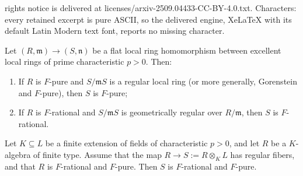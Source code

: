 \documentclass[10pt,a4paper]{amsart}
\newcommand{\fm}{\mathfrak{m}}
\newcommand{\fn}{\mathfrak{n}}
\begin{document}
rights notice is delivered at licenses/arxiv-2509.04433-CC-BY-4.0.txt. Characters: every retained excerpt is pure ASCII, so the delivered engine, XeLaTeX with its default Latin Modern text font, reports no missing character.
\begin{theorem}\label{thm:F-sing-base-change}
    Let $(R,\fm)\to (S,\fn)$ be a flat local ring homomorphism between excellent local rings of prime characteristic $p>0$. Then:
\begin{enumerate}[label=(\roman*)]
    \item If $R$ is $F$-pure and $S/\fm S$ is a regular local ring (or more generally, Gorenstein and $F$-pure), then $S$ is $F$-pure;\label{thm:F-pure-base-change}
    \item If $R$ is $F$-rational and $S/\fm S$ is geometrically regular over $R/\fm$, then $S$ is $F$-rational. \label{thm:F-rat-base-change}
\end{enumerate}
\end{theorem}

\begin{lemma} \label{B1:F-rational-F-pure} Let $K \subseteq L$ be a finite extension of fields of characteristic $p>0$, and let $R$ be a $K$-algebra of finite type. Assume that the map $R \to S:=R \otimes_K L$ has regular fibers, and that $R$ is $F$-rational and $F$-pure. Then $S$ is $F$-rational and $F$-pure.
\end{lemma}
\end{document}
